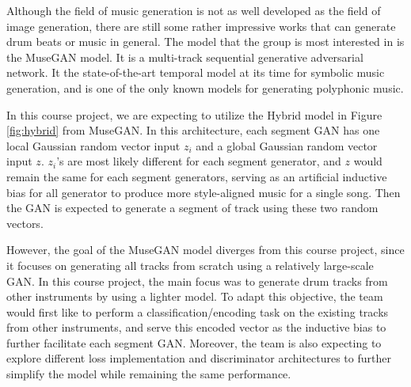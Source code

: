 \begin{par}
    \par \hspace{15pt} Although the field of music generation is not as well developed as the field of image generation, there are still some rather impressive works that can generate drum beats or music in general. The model that the group is most interested in is the MuseGAN \cite{musegan} model. It is a multi-track sequential generative adversarial network. It the state-of-the-art temporal model at its time for symbolic music generation, and is one of the only known models for generating polyphonic music. 

    \par In this course project, we are expecting to utilize the Hybrid model in Figure \ref{fig:hybrid} from MuseGAN. In this architecture, each segment GAN has one local Gaussian random vector input $z_i$ and a global Gaussian random vector input $z$. $z_i$'s are most likely different for each segment generator, and $z$ would remain the same for each segment generators, serving as an artificial inductive bias for all generator to produce more style-aligned music for a single song. Then the GAN is expected to generate a segment of track using these two random vectors. 

    \par However, the goal of the MuseGAN model diverges from this course project, since it focuses on generating all tracks from scratch using a relatively large-scale GAN. In this course project, the main focus was to generate drum tracks from other instruments by using a lighter model. To adapt this objective, the team would first like to perform a classification/encoding task on the existing tracks from other instruments, and serve this encoded vector as the inductive bias to further facilitate each segment GAN. Moreover, the team is also expecting to explore different loss implementation and discriminator architectures to further simplify the model while remaining the same performance. 

    


\end{par}
